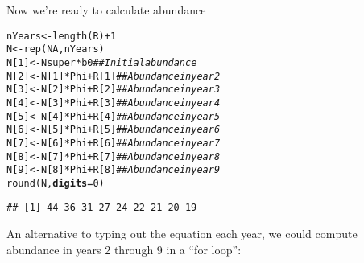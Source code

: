 \documentclass[12pt]{article}\usepackage[]{graphicx}\usepackage[]{xcolor}
\makeatletter
\newcommand{\hlnum}[1]{\textcolor[rgb]{0.69,0.494,0}{#1}}%
\newcommand{\hlcom}[1]{\textcolor[rgb]{0.514,0.506,0.514}{\textit{#1}}}%
\newcommand{\hlopt}[1]{\textcolor[rgb]{0,0,0}{#1}}%
\newcommand{\hldef}[1]{\textcolor[rgb]{0,0,0}{#1}}%
\newcommand{\hlkwb}[1]{\textcolor[rgb]{0,0.341,0.682}{#1}}%
\newcommand{\hlkwc}[1]{\textcolor[rgb]{0,0,0}{\textbf{#1}}}%
\newcommand{\hlkwd}[1]{\textcolor[rgb]{0.004,0.004,0.506}{#1}}%
\newenvironment{kframe}{%
 \def\at@end@of@kframe{}%
 \ifinner\ifhmode%
  \def\at@end@of@kframe{\end{minipage}}%
  \begin{minipage}{\columnwidth}%
 \fi\fi%
 \def\FrameCommand##1{\hskip\@totalleftmargin \hskip-\fboxsep
 \colorbox{shadecolor}{##1}\hskip-\fboxsep
     \hskip-\linewidth \hskip-\@totalleftmargin \hskip\columnwidth}%
 \MakeFramed {\advance\hsize-\width
   \@totalleftmargin\z@ \linewidth\hsize
   \@setminipage}}%
 {\par\unskip\endMakeFramed%
 \at@end@of@kframe}
\newenvironment{knitrout}{}{} %
\makeatother
\begin{document}
Now we're ready to calculate abundance

\begin{knitrout}
\color{fgcolor}\begin{kframe}
\begin{alltt}
\hldef{nYears} \hlkwb{<-} \hlkwd{length}\hldef{(R)}\hlopt{+}\hlnum{1}
\hldef{N} \hlkwb{<-} \hlkwd{rep}\hldef{(}\hlnum{NA}\hldef{, nYears)}
\hldef{N[}\hlnum{1}\hldef{]} \hlkwb{<-} \hldef{Nsuper}\hlopt{*}\hldef{b0}            \hlcom{## Initial abundance}
\hldef{N[}\hlnum{2}\hldef{]} \hlkwb{<-} \hldef{N[}\hlnum{1}\hldef{]}\hlopt{*}\hldef{Phi} \hlopt{+} \hldef{R[}\hlnum{1}\hldef{]}      \hlcom{## Abundance in year 2}
\hldef{N[}\hlnum{3}\hldef{]} \hlkwb{<-} \hldef{N[}\hlnum{2}\hldef{]}\hlopt{*}\hldef{Phi} \hlopt{+} \hldef{R[}\hlnum{2}\hldef{]}      \hlcom{## Abundance in year 3}
\hldef{N[}\hlnum{4}\hldef{]} \hlkwb{<-} \hldef{N[}\hlnum{3}\hldef{]}\hlopt{*}\hldef{Phi} \hlopt{+} \hldef{R[}\hlnum{3}\hldef{]}      \hlcom{## Abundance in year 4}
\hldef{N[}\hlnum{5}\hldef{]} \hlkwb{<-} \hldef{N[}\hlnum{4}\hldef{]}\hlopt{*}\hldef{Phi} \hlopt{+} \hldef{R[}\hlnum{4}\hldef{]}      \hlcom{## Abundance in year 5}
\hldef{N[}\hlnum{6}\hldef{]} \hlkwb{<-} \hldef{N[}\hlnum{5}\hldef{]}\hlopt{*}\hldef{Phi} \hlopt{+} \hldef{R[}\hlnum{5}\hldef{]}      \hlcom{## Abundance in year 6}
\hldef{N[}\hlnum{7}\hldef{]} \hlkwb{<-} \hldef{N[}\hlnum{6}\hldef{]}\hlopt{*}\hldef{Phi} \hlopt{+} \hldef{R[}\hlnum{6}\hldef{]}      \hlcom{## Abundance in year 7}
\hldef{N[}\hlnum{8}\hldef{]} \hlkwb{<-} \hldef{N[}\hlnum{7}\hldef{]}\hlopt{*}\hldef{Phi} \hlopt{+} \hldef{R[}\hlnum{7}\hldef{]}      \hlcom{## Abundance in year 8}
\hldef{N[}\hlnum{9}\hldef{]} \hlkwb{<-} \hldef{N[}\hlnum{8}\hldef{]}\hlopt{*}\hldef{Phi} \hlopt{+} \hldef{R[}\hlnum{8}\hldef{]}      \hlcom{## Abundance in year 9}
\hlkwd{round}\hldef{(N,} \hlkwc{digits}\hldef{=}\hlnum{0}\hldef{)}
\end{alltt}
\begin{verbatim}
## [1] 44 36 31 27 24 22 21 20 19
\end{verbatim}
\end{kframe}
\end{knitrout}

\clearpage

An alternative to typing out the equation each year, we could compute
abundance in years 2 through 9 in a ``for loop'':
\end{document}
